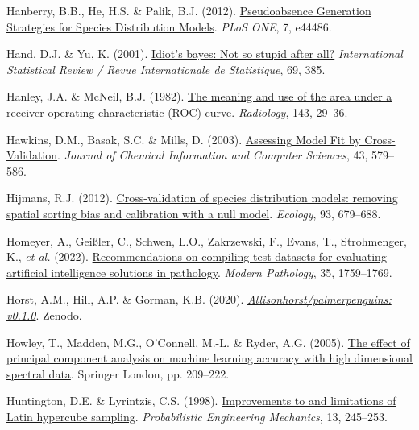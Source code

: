 \documentclass[
  letterpaper,
]{scrbook}
\newlength{\cslhangindent}
\newenvironment{CSLReferences}[2] %
 {\begin{list}{}{%
  \setlength{\itemindent}{0pt}
  \setlength{\leftmargin}{0pt}
  \setlength{\parsep}{0pt}
  \ifodd #1
   \setlength{\leftmargin}{\cslhangindent}
   \setlength{\itemindent}{-1\cslhangindent}
  \fi
  \setlength{\itemsep}{#2\baselineskip}}}
 {\end{list}}
\begin{document}
\begin{CSLReferences}{1}{0}
Hanberry, B.B., He, H.S. \& Palik, B.J. (2012).
\href{https://doi.org/10.1371/journal.pone.0044486}{Pseudoabsence
Generation Strategies for Species Distribution Models}. \emph{PLoS ONE},
7, e44486.

Hand, D.J. \& Yu, K. (2001).
\href{https://doi.org/10.2307/1403452}{Idiot's bayes: Not so stupid
after all?} \emph{International Statistical Review / Revue
Internationale de Statistique}, 69, 385.

Hanley, J.A. \& McNeil, B.J. (1982).
\href{https://doi.org/10.1148/radiology.143.1.7063747}{The meaning and
use of the area under a receiver operating characteristic (ROC) curve.}
\emph{Radiology}, 143, 29--36.

Hawkins, D.M., Basak, S.C. \& Mills, D. (2003).
\href{https://doi.org/10.1021/ci025626i}{Assessing Model Fit by
Cross-Validation}. \emph{Journal of Chemical Information and Computer
Sciences}, 43, 579--586.

Hijmans, R.J. (2012).
\href{https://doi.org/10.1890/11-0826.1}{Cross-validation of species
distribution models: removing spatial sorting bias and calibration with
a null model}. \emph{Ecology}, 93, 679--688.

Homeyer, A., Geißler, C., Schwen, L.O., Zakrzewski, F., Evans, T.,
Strohmenger, K., \emph{et al.} (2022).
\href{https://doi.org/10.1038/s41379-022-01147-y}{Recommendations on
compiling test datasets for evaluating artificial intelligence solutions
in pathology}. \emph{Modern Pathology}, 35, 1759--1769.

Horst, A.M., Hill, A.P. \& Gorman, K.B. (2020).
\emph{\href{https://doi.org/10.5281/ZENODO.3960218}{Allisonhorst/palmerpenguins:
v0.1.0}}. Zenodo.

Howley, T., Madden, M.G., O'Connell, M.-L. \& Ryder, A.G. (2005).
\href{https://doi.org/10.1007/1-84628-224-1_16}{The effect of principal
component analysis on machine learning accuracy with high dimensional
spectral data}. Springer London, pp. 209--222.

Huntington, D.E. \& Lyrintzis, C.S. (1998).
\href{https://doi.org/10.1016/s0266-8920(97)00013-1}{Improvements to and
limitations of Latin hypercube sampling}. \emph{Probabilistic
Engineering Mechanics}, 13, 245--253.


\end{CSLReferences}
\end{document}
